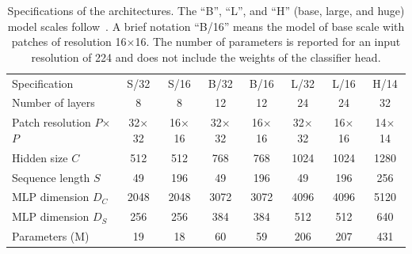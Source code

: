 \begin{table}[tb]
  \caption{Specifications of the \name{} architectures.
  The ``B'', ``L'', and ``H'' (base, large, and huge) model scales follow~\citet{Dosovitskiy2021}.
  A brief notation ``B/16'' means the model of base scale with patches of resolution 16$\times$16.
  The number of parameters is reported for an input resolution of 224 and does not include the weights of the classifier head.
  }
  \medskip
  \label{table:architecture-configs}
  \centering
  \small
  \begin{tabular}{@{}lccccccc@{}}
    \toprule
    Specification & S/32 & S/16 & B/32 & B/16 & L/32 & L/16 & H/14\\
    \cmidrule{1-8}
    Number of layers & 8 & 8 & 12 & 12 & 24 & 24 & 32\\
    Patch resolution $P$$\times$$P$ & 32$\times$32 & 16$\times$16 & 32$\times$32 & 16$\times$16 & 32$\times$32 & 16$\times$16 & 14$\times$14\\
    Hidden size $C$ & 512 & 512 & 768 & 768 & 1024 & 1024 & 1280\\
    Sequence length $S$ & 49 & 196 & 49 & 196 & 49 & 196 & 256\\
    MLP dimension $D_C$ & 2048 & 2048 & 3072 & 3072 & 4096 & 4096 & 5120\\
    MLP dimension $D_S$ & 256 & 256 & 384 & 384 & 512 & 512 & 640\\
    Parameters (M) & 19 & 18 & 60 & 59 & 206 & 207 & 431\\
    \bottomrule
  \end{tabular}
  \vspace{-.2cm} %
\end{table}

